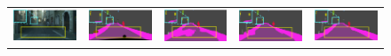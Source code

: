 \documentclass[letterpaper]{article} %
\begin{document}
\begin{figure}[!t]
  \centering
  \setlength{\fboxsep}{0pt}
  \begin{tabular}{ccccc}
  \includegraphics[width=0.19\linewidth]{image/figure6/1a.png}\label{1a} &
  \hspace{-12pt}
  \includegraphics[width=0.19\linewidth]{image/figure6/1b.png}\label{1b} &
  \hspace{-12pt}
  \includegraphics[width=0.19\linewidth]{image/figure6/1c.png}\label{1c} &
  \hspace{-12pt}
  \includegraphics[width=0.19\linewidth]{image/figure6/1d.png}\label{1d} &
  \hspace{-12pt}
  \includegraphics[width=0.19\linewidth]{image/figure6/1e.png}\label{1e} \\
  

\end{tabular}
\end{figure}
\end{document}
